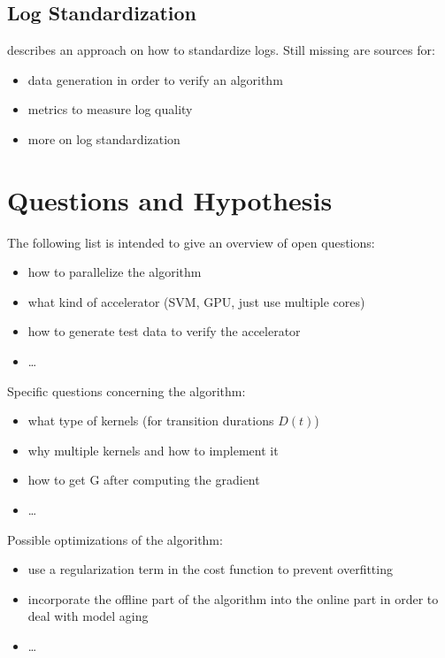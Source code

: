 \documentclass[12pt]{article} %
\begin{document}

\subsection{Log Standardization} %

\cite{IPDPS04_Salfner} describes an approach on how to standardize logs. Still
missing are sources for:
\begin{itemize}
    \item data generation in order to verify an algorithm
    \item metrics to measure log quality
    \item more on log standardization
\end{itemize}


\section{Questions and Hypothesis} %

The following list is intended to give an overview of open questions:
\begin{itemize}
    \item how to parallelize the algorithm
    \item what kind of accelerator (SVM, GPU, just use multiple cores)
    \item how to generate test data to verify the accelerator
    \item \dots
\end{itemize}

Specific questions concerning the algorithm:
\begin{itemize}
    \item what type of kernels (for transition durations $ D(t) $)
    \item why multiple kernels and how to implement it
    \item how to get G after computing the gradient
    \item \dots
\end{itemize}

Possible optimizations of the algorithm:
\begin{itemize}
    \item use a regularization term in the cost function to prevent overfitting
    \item incorporate the offline part of the algorithm into the online part in
        order to deal with model aging
    \item \dots
\end{itemize}
\end{document}
